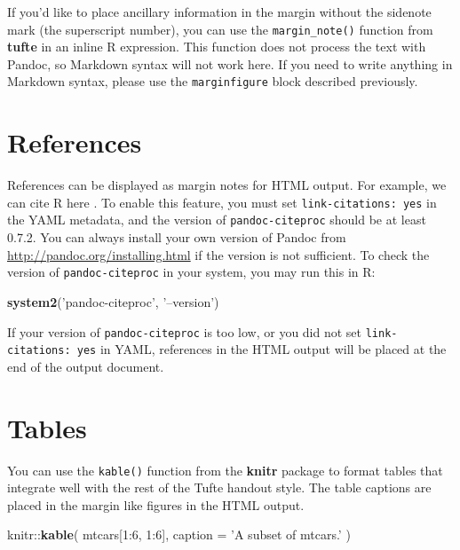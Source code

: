 \documentclass[]{tufte-book}
\newenvironment{Shaded}{}{}
\newcommand{\DataTypeTok}[1]{\textcolor[rgb]{0.56,0.13,0.00}{#1}}
\newcommand{\DecValTok}[1]{\textcolor[rgb]{0.25,0.63,0.44}{#1}}
\newcommand{\KeywordTok}[1]{\textcolor[rgb]{0.00,0.44,0.13}{\textbf{#1}}}
\newcommand{\NormalTok}[1]{#1}
\newcommand{\OperatorTok}[1]{\textcolor[rgb]{0.40,0.40,0.40}{#1}}
\newcommand{\StringTok}[1]{\textcolor[rgb]{0.25,0.44,0.63}{#1}}
\begin{document}
If you'd like to place ancillary information in the margin without the
sidenote mark (the superscript number), you can use the
\texttt{margin\_note()} function from \textbf{tufte} in an inline R
expression.
This function does not process the text with Pandoc, so Markdown syntax
will not work here. If you need to write anything in Markdown syntax,
please use the \texttt{marginfigure} block described previously.

\hypertarget{references}{%
\chapter{References}\label{references}}

References can be displayed as margin notes for HTML output. For
example, we can cite R here \citep{R-base}. To enable this feature, you
must set \texttt{link-citations:\ yes} in the YAML metadata, and the
version of \texttt{pandoc-citeproc} should be at least 0.7.2. You can
always install your own version of Pandoc from
\url{http://pandoc.org/installing.html} if the version is not
sufficient. To check the version of \texttt{pandoc-citeproc} in your
system, you may run this in R:

\begin{Shaded}
\begin{Highlighting}[]
\KeywordTok{system2}\NormalTok{(}\StringTok{'pandoc-citeproc'}\NormalTok{, }\StringTok{'--version'}\NormalTok{)}
\end{Highlighting}
\end{Shaded}

If your version of \texttt{pandoc-citeproc} is too low, or you did not
set \texttt{link-citations:\ yes} in YAML, references in the HTML output
will be placed at the end of the output document.

\hypertarget{tables}{%
\chapter{Tables}\label{tables}}

You can use the \texttt{kable()} function from the \textbf{knitr}
package to format tables that integrate well with the rest of the Tufte
handout style. The table captions are placed in the margin like figures
in the HTML output.

\begin{Shaded}
\begin{Highlighting}[]
\NormalTok{knitr}\OperatorTok{::}\KeywordTok{kable}\NormalTok{(}
\NormalTok{  mtcars[}\DecValTok{1}\OperatorTok{:}\DecValTok{6}\NormalTok{, }\DecValTok{1}\OperatorTok{:}\DecValTok{6}\NormalTok{], }\DataTypeTok{caption =} \StringTok{'A subset of mtcars.'}
\NormalTok{)}
\end{Highlighting}
\end{Shaded}
\end{document}

